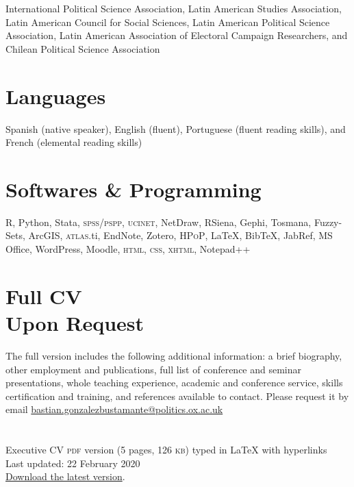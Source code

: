 \documentclass[letterpaper,margin]{res}
\begin{document}
\begin{resume}
{\small International Political Science Association, Latin American Studies Association, Latin American Council for Social Sciences, Latin American Political Science Association, Latin American Association of Electoral Campaign Researchers, and Chilean Political Science Association}


\section{\footnotesize Languages}

{\small Spanish (native speaker), English (fluent), Portuguese (fluent reading skills), and French (elemental reading skills)}


\section{\footnotesize Softwares \& Programming}

{\small R, Python, Stata, {\scshape spss/pspp}, {\scshape ucinet}, NetDraw, RSiena, Gephi, Tosmana, Fuzzy-Sets, ArcGIS, {\scshape atlas}.ti, EndNote, Zotero, {\scshape HPoP}, {\LaTeX}, Bib{\TeX}, JabRef, MS Office, WordPress, Moodle, {\scshape html}, {\scshape css}, {\scshape xhtml}, Notepad{\footnotesize ++}}


\section{\footnotesize Full CV \\ Upon Request}

{\small The full version includes the following additional information: a brief biography, other employment and publications, full list of conference and seminar presentations, whole teaching experience, academic and conference service, skills certification and training, and references available to contact. Please request it by email {\large \Letter} \href{mailto:bastian.gonzalezbustamante@politics.ox.ac.uk}{bastian.gonzalezbustamante@politics.ox.ac.uk}}\\

\section{}
{\footnotesize Executive CV {\scshape pdf} version (5 pages, 126 {\scshape kb}) typed in {\small {\LaTeX}} with hyperlinks}\\
{\footnotesize Last updated: 22 February 2020}\\
{\footnotesize {\normalsize \faGithub} \href{https://github.com/bgonzalezbustamante/CV-LaTeX}{Download the latest version}.}

\end{resume} 
\end{document}
